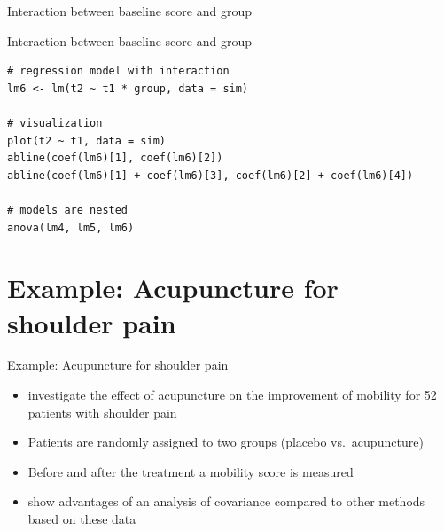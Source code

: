 \documentclass[aspectratio=169]{beamer}
\begin{document}
\begin{frame}{Interaction between baseline score and group}
\begin{center}
\end{center}
\end{frame}

\begin{frame}[fragile]{Interaction between baseline score and group}
\begin{lstlisting}
# regression model with interaction
lm6 <- lm(t2 ~ t1 * group, data = sim)

# visualization
plot(t2 ~ t1, data = sim)
abline(coef(lm6)[1], coef(lm6)[2])
abline(coef(lm6)[1] + coef(lm6)[3], coef(lm6)[2] + coef(lm6)[4])

# models are nested
anova(lm4, lm5, lm6)
\end{lstlisting}
\end{frame}

\section[Example]{Example: Acupuncture for shoulder pain}

\begin{frame}{Example: Acupuncture for shoulder pain}
\begin{itemize}
  \item \citet{Kleinhenz1999} investigate the effect of acupuncture on the
    improvement of mobility for 52 patients with shoulder pain
  \item Patients are randomly assigned to two groups (placebo vs.\ acupuncture)
  \item Before and after the treatment a mobility score is measured
  \item \citet{VickersAltman2001} show advantages of an analysis of covariance
    compared to other methods based on these data
\end{itemize}
\end{frame}
\end{document}
